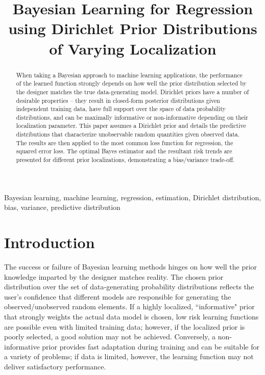 \documentclass{article}
\title{Bayesian Learning for Regression using Dirichlet Prior Distributions of Varying Localization}
\begin{document}
	
	\maketitle
	
	
	\begin{abstract}
		When taking a Bayesian approach to machine learning applications, the performance of the learned function strongly depends on how well the prior distribution selected by the designer matches the true data-generating model. Dirichlet priors have a number of desirable properties -- they result in closed-form posterior distributions given independent training data, have full support over the space of data probability distributions, and can be maximally informative or non-informative depending on their localization parameter. This paper assumes a Dirichlet prior and details the predictive distributions that characterize unobservable random quantities given observed data. The results are then applied to the most common loss function for regression, the squared error loss. The optimal Bayes estimator and the resultant risk trends are presented for different prior localizations, demonstrating a bias/variance trade-off. 
	\end{abstract}
	
	\begin{keywords}
		Bayesian learning, machine learning, regression, estimation, Dirichlet distribution, bias, variance, predictive distribution
	\end{keywords}
	
	
	\section{Introduction}
	
	The success or failure of Bayesian learning methods hinges on how well the prior knowledge imparted by the designer matches reality. The chosen prior distribution over the set of data-generating probability distributions reflects the user's confidence that different models are responsible for generating the observed/unobserved random elements. If a highly localized, ``informative" prior that strongly weights the actual data model is chosen, low risk learning functions are possible even with limited training data; however, if the localized prior is poorly selected, a good solution may not be achieved. Conversely, a non-informative prior provides fast adaptation during training and can be suitable for a variety of problems; if data is limited, however, the learning function may not deliver satisfactory performance.
	
\end{document}
